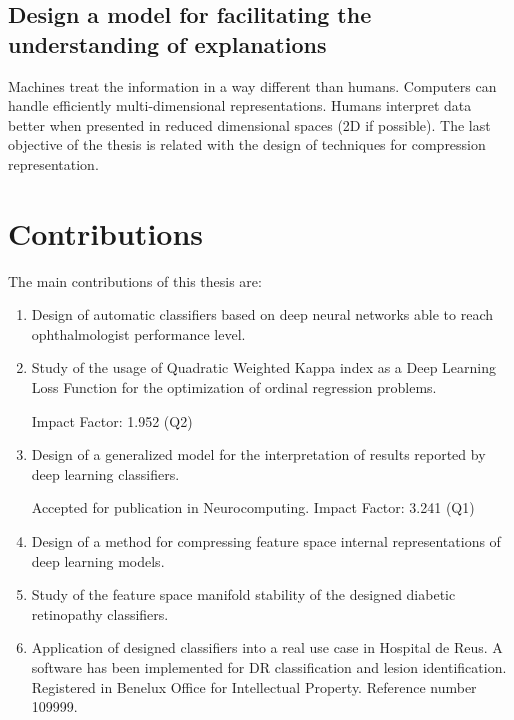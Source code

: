 \subsection{Design a model for facilitating the understanding of explanations}

Machines treat the information in a way different than humans. Computers can handle efficiently multi-dimensional representations. Humans interpret data better when presented in reduced dimensional spaces (2D if possible). The last objective of the thesis is related with the design of techniques for compression representation.

\section{Contributions}

The main contributions of this thesis are:

\begin{enumerate}
	\item Design of automatic classifiers based on deep neural networks able to reach ophthalmologist performance level.
	
	
	\item Study of the usage of Quadratic Weighted Kappa index as a Deep Learning Loss Function for the optimization of ordinal regression problems.
	
	 Impact Factor: 1.952 (Q2)
	
	\item Design of a generalized model for the interpretation of results reported by deep learning classifiers.
	
	 Accepted for publication in Neurocomputing. Impact Factor: 3.241 (Q1)
	
	\item Design of a method for compressing feature space internal representations of deep learning models.
	
	
	\item Study of the feature space manifold stability of the designed diabetic retinopathy classifiers.
	
	\item Application of designed classifiers into a real use case in Hospital de Reus. A software has been implemented for DR classification and lesion identification. Registered in Benelux Office for Intellectual Property. Reference number 109999.
\end{enumerate}


